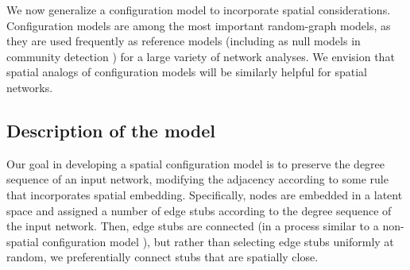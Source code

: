 \documentclass[%
 reprint,
 amsmath,amssymb,
 aps,
]{revtex4-1}
\begin{document}
We now generalize a configuration model \cite{fosdick, newman2018} to incorporate spatial considerations. Configuration models are among the most important random-graph models, as they are used frequently as reference models (including as null models in community detection \cite{community1, community2}) for a large variety of network analyses. We envision that spatial analogs of configuration models will be similarly helpful for spatial networks.


\subsection{Description of the model}

{\color{red}Our goal in developing a spatial configuration model is to preserve the degree sequence of an input network, modifying the adjacency according to some rule that incorporates spatial embedding. Specifically, nodes are embedded in a latent space and assigned a number of edge stubs according to the degree sequence of the input network. Then, edge stubs are connected (in a process similar to a non-spatial configuration model \cite{fosdick}), but rather than selecting edge stubs uniformly at random, we preferentially connect stubs that are spatially close. }

\end{document}
